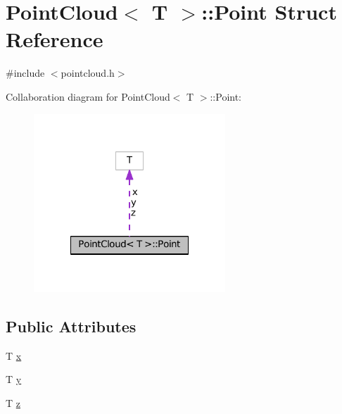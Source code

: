\hypertarget{struct_point_cloud_1_1_point}{\section{Point\-Cloud$<$ T $>$\-:\-:Point Struct Reference}
\label{struct_point_cloud_1_1_point}
}


{\ttfamily \#include $<$pointcloud.\-h$>$}



Collaboration diagram for Point\-Cloud$<$ T $>$\-:\-:Point\-:\nopagebreak
\begin{figure}[H]
\begin{center}
\leavevmode
\includegraphics[width=204pt]{struct_point_cloud_1_1_point__coll__graph}
\end{center}
\end{figure}
\subsection*{Public Attributes}
\begin{DoxyCompactItemize}
\item 
T \hyperlink{struct_point_cloud_1_1_point_a4c9755e331a4b3c82f69bf73573a85cb}{x}
\item 
T \hyperlink{struct_point_cloud_1_1_point_a04e6140b52712a7fcabdb3b8d06040fc}{y}
\item 
T \hyperlink{struct_point_cloud_1_1_point_a606a44d077bc9f483cf6ff58c4896a14}{z}
\end{DoxyCompactItemize}


